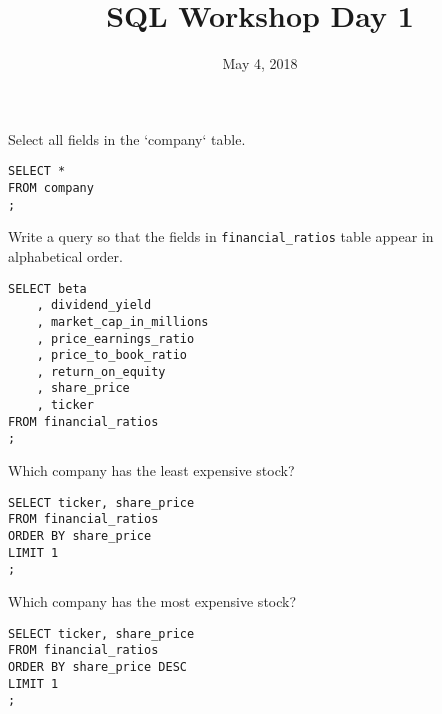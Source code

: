 \documentclass[10pt]{exam}
\begin{document}
 
\title{SQL Workshop Day 1}
\date{May 4, 2018}

\maketitle

\begin{questions}


\question Select all fields in the `company` table.

\begin{solution}
\begin{lstlisting}
SELECT *
FROM company
;
\end{lstlisting}
\end{solution}


\question Write a query so that the fields in \texttt{financial\_ratios} table
appear in alphabetical order.

\begin{solution}
\begin{lstlisting}
SELECT beta
	, dividend_yield
	, market_cap_in_millions
	, price_earnings_ratio
	, price_to_book_ratio
	, return_on_equity
	, share_price
	, ticker
FROM financial_ratios
;
\end{lstlisting}
\end{solution}


\question Which company has the least expensive stock?

\begin{solution}
\begin{lstlisting}
SELECT ticker, share_price
FROM financial_ratios
ORDER BY share_price
LIMIT 1
;
\end{lstlisting}
\end{solution}


\question Which company has the most expensive stock?

\begin{solution}
\begin{lstlisting}
SELECT ticker, share_price
FROM financial_ratios
ORDER BY share_price DESC
LIMIT 1
;
\end{lstlisting}
\end{solution}



\end{questions}
\end{document}
